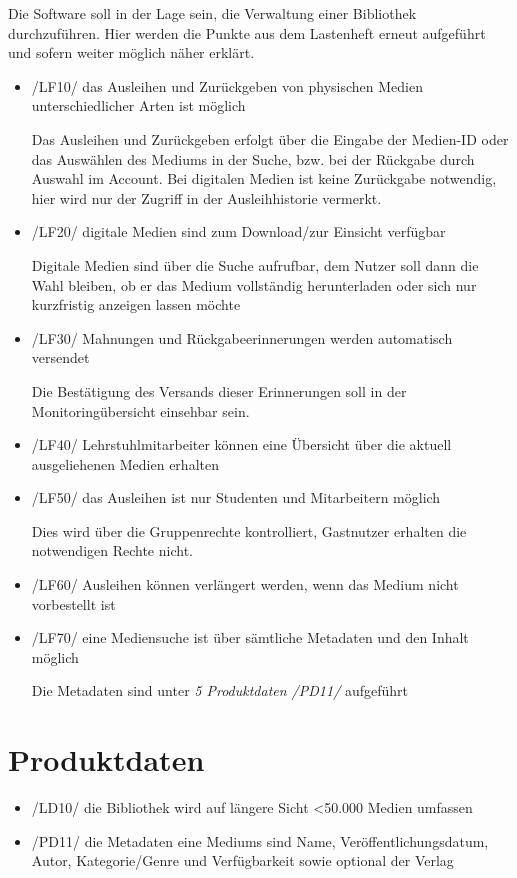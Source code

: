 \documentclass[12pt, a4paper]{article}
\begin{document}
Die Software soll in der Lage sein, die Verwaltung einer Bibliothek durchzuführen. Hier werden die Punkte aus dem Lastenheft erneut aufgeführt und sofern weiter möglich näher erklärt.
\begin{itemize}
	\item /LF10/ das Ausleihen und Zurückgeben von physischen Medien unterschiedlicher Arten ist möglich

		Das Ausleihen und Zurückgeben erfolgt über die Eingabe der Medien-ID oder das Auswählen des Mediums in der Suche, bzw. bei der Rückgabe durch Auswahl im Account.
		Bei digitalen Medien ist keine Zurückgabe notwendig, hier wird nur der Zugriff in der Ausleihhistorie vermerkt.
	\item /LF20/ digitale Medien sind zum Download/zur Einsicht verfügbar

	Digitale Medien sind über die Suche aufrufbar, dem Nutzer soll dann die Wahl bleiben, ob er das Medium vollständig herunterladen oder sich nur kurzfristig anzeigen lassen möchte
	\item /LF30/ Mahnungen und Rückgabeerinnerungen werden automatisch versendet

	Die Bestätigung des Versands dieser Erinnerungen soll in der Monitoringübersicht einsehbar sein.

	\item /LF40/ Lehrstuhlmitarbeiter können eine Übersicht über die aktuell ausgeliehenen Medien erhalten

	\item /LF50/ das Ausleihen ist nur Studenten und Mitarbeitern möglich

	Dies wird über die Gruppenrechte kontrolliert, Gastnutzer erhalten die notwendigen Rechte nicht.
	\item /LF60/ Ausleihen können verlängert werden, wenn das Medium nicht vorbestellt ist
	\item /LF70/ eine Mediensuche ist über sämtliche Metadaten und den Inhalt möglich

	Die Metadaten sind unter \textit{5 Produktdaten /PD11/} aufgeführt
\end{itemize}
\pagebreak

\section{Produktdaten}
\begin{itemize}
	\item /LD10/ die Bibliothek wird auf längere Sicht <50.000 Medien umfassen
	\item /PD11/ die Metadaten eine Mediums sind Name, Veröffentlichungsdatum, Autor, Kategorie/Genre und Verfügbarkeit sowie optional der Verlag
\end{itemize}
\end{document}
